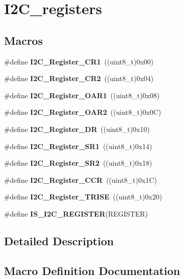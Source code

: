 \section{I2\+C\+\_\+registers}
\label{group__I2C__registers}
\subsection*{Macros}
\begin{DoxyCompactItemize}
\item 
\#define \textbf{ I2\+C\+\_\+\+Register\+\_\+\+C\+R1}~((uint8\+\_\+t)0x00)
\item 
\#define \textbf{ I2\+C\+\_\+\+Register\+\_\+\+C\+R2}~((uint8\+\_\+t)0x04)
\item 
\#define \textbf{ I2\+C\+\_\+\+Register\+\_\+\+O\+A\+R1}~((uint8\+\_\+t)0x08)
\item 
\#define \textbf{ I2\+C\+\_\+\+Register\+\_\+\+O\+A\+R2}~((uint8\+\_\+t)0x0\+C)
\item 
\#define \textbf{ I2\+C\+\_\+\+Register\+\_\+\+DR}~((uint8\+\_\+t)0x10)
\item 
\#define \textbf{ I2\+C\+\_\+\+Register\+\_\+\+S\+R1}~((uint8\+\_\+t)0x14)
\item 
\#define \textbf{ I2\+C\+\_\+\+Register\+\_\+\+S\+R2}~((uint8\+\_\+t)0x18)
\item 
\#define \textbf{ I2\+C\+\_\+\+Register\+\_\+\+C\+CR}~((uint8\+\_\+t)0x1\+C)
\item 
\#define \textbf{ I2\+C\+\_\+\+Register\+\_\+\+T\+R\+I\+SE}~((uint8\+\_\+t)0x20)
\item 
\#define \textbf{ I\+S\+\_\+\+I2\+C\+\_\+\+R\+E\+G\+I\+S\+T\+ER}(R\+E\+G\+I\+S\+T\+ER)
\end{DoxyCompactItemize}


\subsection{Detailed Description}


\subsection{Macro Definition Documentation}
\mbox{\label{group__I2C__registers_ga7a0de765650408f3915b54141f052c5b}} 
